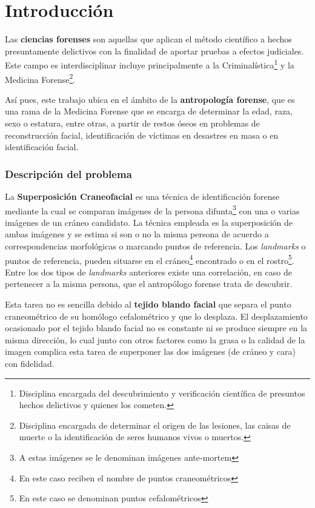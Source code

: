 
\chapter{Introducción}  \label{ch:Introduccion_informatica}

Las \textbf{ciencias forenses} son aquellas que aplican el método científico a hechos presuntamente delictivos con la finalidad de aportar pruebas a efectos judiciales. Este campo es interdisciplinar incluye principalmente a la Criminalística\footnote{Disciplina encargada del descubrimiento y verificación científica de presuntos hechos delictivos y quienes los cometen.} y la Medicina Forense\footnote{Disciplina encargada de determinar el origen de las lesiones, las caisas de muerte o la identificación de seres humanos vivos o muertos.}. 

\medskip

\noindent Así pues, este trabajo ubica en el ámbito de la \textbf{antropología forense}, que es una rama de la Medicina Forense que se encarga de determinar la edad, raza, sexo o estatura, entre otras, a partir de restos óseos en problemas de reconstrucción facial, identificación de víctimas en desastres en masa o en identificación facial. 


\subsection{Descripción del problema}

La \textbf{Superposición Craneofacial} es una técnica de identificación forense mediante la cual se comparan imágenes de la persona difunta\footnote{A estas imágenes se le denominan imágenes ante-mortem} con una o varias imágenes de un cráneo candidato. La técnica empleada es la superposición de ambas imágenes y se estima si son o no la misma persona de acuerdo a correspondencias morfológicas o marcando puntos de referencia. Los \textit{landmarks} o puntos de referencia, pueden situarse en el cráneo\footnote{En este caso reciben el nombre de puntos craneométricos} encontrado o en el rostro\footnote{En este caso se denominan puntos cefalométricos}. Entre los dos tipos de \textit{landmarks} anteriores existe una correlación, en caso de pertenecer a la misma persona, que el antropólogo forense trata de descubrir. 

\noindent Esta tarea no es sencilla debido al \textbf{tejido blando facial} que separa el punto craneométrico de su homólogo cefalométrico y que lo desplaza. El desplazamiento ocasionado por el tejido blando facial no es constante ni se produce siempre en la misma dirección, lo cual junto con otros factores como la grasa o la calidad de la imagen complica esta tarea de superponer las dos imágenes (de cráneo y cara) con fidelidad.

